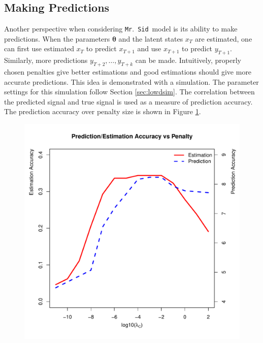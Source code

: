 \documentclass[fleqn,12pt]{article}
\let\oldref\ref
\renewcommand{\ref}[1]{(\oldref{#1})}
\newcommand{\mrsid}{{\sc \texttt{Mr}.~\texttt{Sid}}}
\begin{document}
\subsection{Making Predictions}
Another perspective when considering \mrsid~model is its ability to make predictions. When the parameters $\mathbf{\theta}$ and the latent states $x_T$ are estimated, one can first use estimated $x_T$ to predict $x_{T+1}$ and use $x_{T+1}$ to predict $y_{T+1}$. Similarly, more predictions $y_{T+2},\ldots, y_{T+k}$ can be made. Intuitively, properly chosen penalties give better estimations and good estimations should give more accurate predictions. This idea is demonstrated with a simulation. The parameter settings for this simulation follow Section \oldref{sec:lowdsim}. The correlation between the predicted signal and true signal is used as a measure of prediction accuracy. The prediction accuracy over penalty size is shown in Figure \oldref{fig:estpredaccuracy}.

\begin{figure}
\centering
\includegraphics[scale=0.46]{./figures/est-pred-accuracy.pdf}
\label{fig:estpredaccuracy}
\end{figure}
\end{document}
